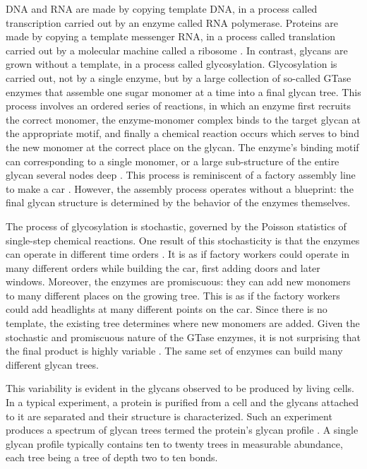 
DNA and RNA are made by copying template DNA, in a process called transcription carried out by an enzyme called RNA polymerase. Proteins are made by copying a template messenger RNA, in a process called translation carried out by a molecular machine called a ribosome \cite{alberts2013essential}. In contrast, glycans are grown without a template, in a process called glycosylation. Glycosylation is carried out, not by a single enzyme, but by a large collection of so-called GTase enzymes that assemble one sugar monomer at a time into a final glycan tree. This process involves an ordered series of reactions, in which an enzyme first recruits the correct monomer, the enzyme-monomer complex binds to the target glycan at the appropriate motif, and finally a chemical reaction occurs which serves to bind the new monomer at the correct place on the glycan. The enzyme's binding motif can corresponding to a single monomer, or a large sub-structure of the entire glycan several nodes deep \cite{biswas2020promiscuity}. This process is reminiscent of a factory assembly line to make a car \cite{Jaiman2018}. However, the assembly process operates without a blueprint: the final glycan structure is determined by the behavior of the enzymes themselves.

The process of glycosylation is stochastic, governed by the Poisson statistics of single-step chemical reactions. One result of this stochasticity is that the enzymes can operate in different time orders \cite{Spahn2016}. It is as if factory workers could operate in many different orders while building the car, first adding doors and later windows. Moreover, the enzymes are promiscuous: they can add new monomers to many different places on the growing tree. This is as if the factory workers could add headlights at many different points on the car. Since there is no template, the existing tree determines where new monomers are added. Given the stochastic and promiscuous nature of the GTase enzymes, it is not surprising that the final product is highly variable \cite{Spahn2014}. The same set of enzymes can build many different glycan trees.

This variability is evident in the glycans observed to be produced by living cells. In a typical experiment, a protein is purified from a cell and the glycans attached to it are separated and their structure is characterized. Such an experiment produces a spectrum of glycan trees termed the protein's glycan profile \cite{Spahn2014}. A single glycan profile typically contains ten to twenty trees in measurable abundance, each tree being a tree of depth two to ten bonds. 

